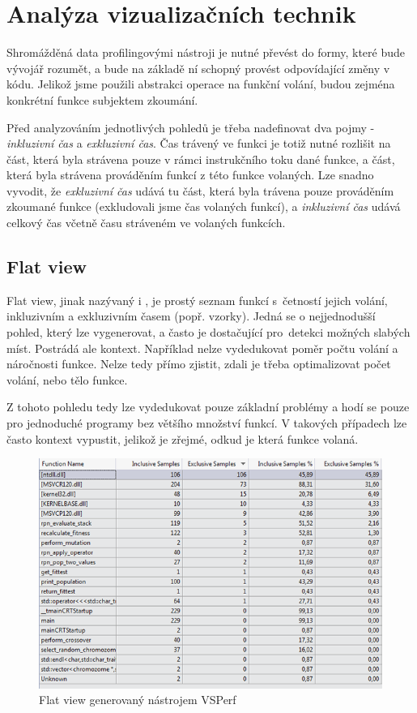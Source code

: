 \documentclass[czech,BP]{thesiskiv}
\begin{document}
\newpage

\chapter{Analýza vizualizačních technik}

Shromážděná data profilingovými nástroji je nutné převést do formy, které bude vývojář rozumět, a bude na základě ní schopný provést odpovídající změny v kódu. Jelikož jsme použili abstrakci operace na funkční volání, budou zejména konkrétní funkce subjektem zkoumání.

Před analyzováním jednotlivých pohledů je třeba nadefinovat dva pojmy - \emph{inkluzivní čas} a \emph{exkluzivní čas}. Čas trávený ve funkci je totiž nutné rozlišit na část, která byla strávena pouze v rámci instrukčního toku dané funkce, a část, která byla strávena prováděním funkcí z této funkce volaných. Lze snadno vyvodit, že \emph{exkluzivní čas} udává tu část, která byla trávena pouze prováděním zkoumané funkce (exkludovali jsme čas volaných funkcí), a \emph{inkluzivní čas} udává celkový čas včetně času stráveném ve volaných funkcích.

\section{Flat view}

Flat view\cite{flatcite}, jinak nazývaný i , je prostý seznam funkcí s~četností jejich volání, inkluzivním a exkluzivním časem (popř. vzorky). Jedná se o nejjednodušší pohled, který lze vygenerovat, a často je dostačující pro~detekci možných slabých míst. Postrádá ale kontext. Například nelze vydedukovat poměr počtu volání a náročnosti funkce. Nelze tedy přímo zjistit, zdali je třeba optimalizovat počet volání, nebo tělo funkce.

Z tohoto pohledu tedy lze vydedukovat pouze základní problémy a hodí se pouze pro jednoduché programy bez většího množství funkcí. V takových případech lze často kontext vypustit, jelikož je zřejmé, odkud je která funkce volaná.

\begin{figure}[h]
    \centering
    \includegraphics[interpolate,width=1.0\textwidth]{img/prof_flatview.png}
    \caption{Flat view generovaný nástrojem VSPerf}
    \label{obr:flatview}
\end{figure}
\end{document}
